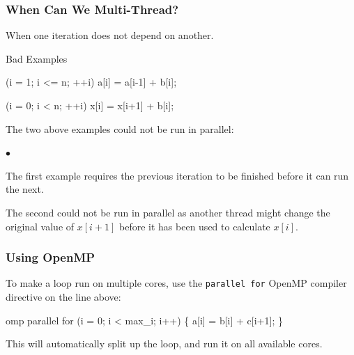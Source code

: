 \documentclass[smaller,handout,table]{beamer}
\begin{document}
\begin{frame}[fragile]
\frametitle{When Can We Multi-Thread?}
When one iteration does not depend on another.
\begin{block}{Bad Examples}
\begin{semiverbatim}
\kl{}(i = 1; i <= n; ++i)  
\kl a[i] = a[i-1] + b[i];

\kl{}(i = 0; i < n; ++i)   
\kl x[i] = x[i+1] + b[i];
\end{semiverbatim}
\end{block}
\begin{block}{}
The two above examples could not be run in parallel:
\begin{list}{$\bullet$}{}
\item The first example requires the previous iteration to be finished before it can run the next.
\item The second could not be run in parallel as another thread might change the original value of $x[i+1]$ before it has been used to calculate $x[i]$.
\end{list}
\end{block}
\end{frame}

\begin{frame}[fragile]
\frametitle{Using OpenMP}
To make a \texttt{} loop run on multiple cores, use the \texttt{parallel for} OpenMP compiler directive on the line above:
\begin{semiverbatim}
\kl{} omp parallel for
\kl{} (i = 0; i < max\_i; i++)
\kl \{
\kl     a[i] = b[i] + c[i+1];
\kl \}
\end{semiverbatim}
This will automatically split up the \texttt{} loop, and run it on all available cores.
\end{frame}
\end{document}
